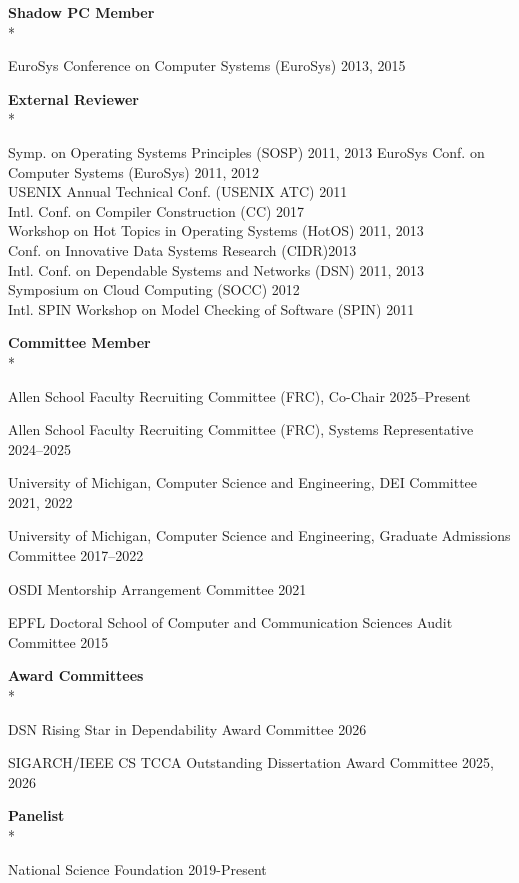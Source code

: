 \documentclass[10pt]{article}
\newcommand{\mysub}[3]{\textbf{#1} {#2} \hfill {\em #3}}
\newcommand{\myssub}[1]{%
  \par\begingroup
    \leftskip=2mm\relax
    \noindent #1\par
  \endgroup
  \vspace{1mm}%
}
\begin{document}
\mysub{Shadow PC Member}{}{} \\* 
\myssub{\vspace{2mm}EuroSys Conference on Computer Systems (EuroSys) \hfill 2013, 2015}

\mysub{External Reviewer}{}{} \\* 
\myssub{\vspace{2mm}Symp. on Operating Systems Principles (SOSP) \hfill 2011, 2013
EuroSys Conf. on Computer Systems (EuroSys) \hfill 2011, 2012 \\
USENIX Annual Technical Conf. (USENIX ATC) \hfill 2011 \\
Intl. Conf. on Compiler Construction (CC) \hfill 2017 \\
Workshop on Hot Topics in Operating Systems (HotOS) \hfill 2011, 2013 \\
Conf. on Innovative Data Systems Research (CIDR)\hfill 2013\\
Intl. Conf. on Dependable Systems and Networks (DSN) \hfill 2011, 2013 \\
Symposium on Cloud Computing (SOCC) \hfill 2012 \\
Intl. SPIN Workshop on Model Checking of Software (SPIN) \hfill 2011}

\mysub{Committee Member}{}{} \\*
\myssub{\vspace{2mm}Allen School Faculty Recruiting Committee (FRC), Co-Chair \hfill 2025--Present}
\myssub{Allen School Faculty Recruiting Committee (FRC), Systems Representative \hfill 2024--2025}
\myssub{University of Michigan, Computer Science and Engineering, DEI Committee \hfill 2021, 2022}
\myssub{University of Michigan, Computer Science and Engineering, Graduate Admissions Committee \hfill 2017--2022}
\myssub{OSDI Mentorship Arrangement Committee \hfill 2021}
\myssub{EPFL Doctoral School of Computer and Communication Sciences Audit Committee \hfill 2015}

\mysub{Award Committees}{}{} \\*
\myssub{\vspace{2mm}DSN Rising Star in Dependability Award Committee \hfill 2026}
\myssub{SIGARCH/IEEE CS TCCA Outstanding Dissertation Award Committee \hfill 2025, 2026}


\mysub{Panelist}{}{} \\*
\myssub{\vspace{2mm}National Science Foundation \hfill 2019-Present}
\end{document}
